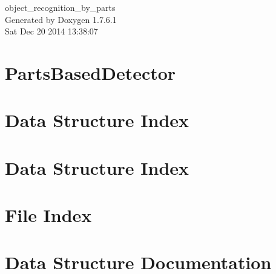\documentclass[a4paper]{book}
\begin{document}
\hypersetup{pageanchor=false,citecolor=blue}
\begin{titlepage}
\vspace*{7cm}
\begin{center}
{\Large object\-\_\-recognition\-\_\-by\-\_\-parts }\\
\vspace*{1cm}
{\large \-Generated by Doxygen 1.7.6.1}\\
\vspace*{0.5cm}
{\small Sat Dec 20 2014 13:38:07}\\
\end{center}
\end{titlepage}
\clearemptydoublepage
{}
\tableofcontents
\clearemptydoublepage
{}
\hypersetup{pageanchor=true,citecolor=blue}
\chapter{\-Parts\-Based\-Detector}
\label{index}\hypertarget{index}{}
\chapter{\-Data \-Structure \-Index}

\chapter{\-Data \-Structure \-Index}

\chapter{\-File \-Index}

\chapter{\-Data \-Structure \-Documentation}

























\end{document}
